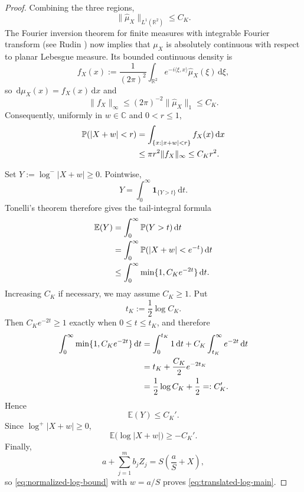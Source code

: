 \documentclass[11pt]{article}
\theoremstyle{definition}
\newcommand{\C}{\mathbb C}
\newcommand{\R}{\mathbb R}
\newcommand{\dd}{\,\mathrm d}
\newcommand{\1}{\mathbf 1}
\begin{document}
\begin{proof}
Combining the three regions,
\begin{equation}\label{eq:L1-characteristic}
\|\widehat\mu_X\|_{L^1(\R^2)}\le C_K.
\end{equation}
The Fourier inversion theorem for finite measures with integrable Fourier transform (see Rudin \cite[Section~1.5.2]{Rudin1962}) now implies that $\mu_X$ is absolutely continuous with respect to planar Lebesgue measure.  Its bounded continuous density is
\begin{equation}\label{eq:density-definition}
f_X(x)
:=
\frac1{(2\pi)^2}
\int_{\R^2}e^{-i\langle\xi,x\rangle}
\widehat\mu_X(\xi)\dd\xi,
\end{equation}
so $\dd\mu_X(x)=f_X(x)\dd x$ and
\begin{equation}\label{eq:density-bound}
\|f_X\|_\infty
\le(2\pi)^{-2}\|\widehat\mu_X\|_1
\le C_K.
\end{equation}
Consequently, uniformly in $w\in\C$ and $0<r\le1$,
\begin{align}
\mathbb P(|X+w|<r)
&=\int_{\{x:|x+w|<r\}}f_X(x)\dd x\notag\\
&\le \pi r^2\|f_X\|_\infty
\le C_Kr^2.
\label{eq:small-ball}
\end{align}

Set $Y:=\log^-|X+w|\ge0$.  Pointwise,
\[
Y=\int_0^\infty\mathbf 1_{\{Y>t\}}\dd t.
\]
Tonelli's theorem therefore gives the tail-integral formula
\begin{align}
\mathbb E(Y)
&=\int_0^\infty\mathbb P(Y>t)\dd t\notag\\
&=\int_0^\infty\mathbb P(|X+w|<e^{-t})\dd t\notag\\
&\le\int_0^\infty\min\{1,C_Ke^{-2t}\}\dd t.
\label{eq:negative-log-tail}
\end{align}
Increasing $C_K$ if necessary, we may assume $C_K\ge1$.  Put
\[
t_K:=\frac12\log C_K.
\]
Then $C_Ke^{-2t}\ge1$ exactly when $0\le t\le t_K$, and therefore
\begin{align}
\int_0^\infty\min\{1,C_Ke^{-2t}\}\dd t
&=\int_0^{t_K}1\dd t
+C_K\int_{t_K}^\infty e^{-2t}\dd t\notag\\
&=t_K+\frac{C_K}{2}e^{-2t_K}\notag\\
&=\frac12\log C_K+\frac12
=:C_K'.
\label{eq:negative-log-bound}
\end{align}
Hence
\[
\mathbb E(Y)\le C_K'.
\]
Since $\log^+|X+w|\ge0$,
\begin{equation}\label{eq:normalized-log-bound}
\mathbb E\bigl(\log|X+w|\bigr)\ge-C_K'.
\end{equation}
Finally,
\[
a+\sum_{j=1}^mb_jZ_j
=S\left(\frac aS+X\right),
\]
so \eqref{eq:normalized-log-bound} with $w=a/S$ proves \eqref{eq:translated-log-main}.
\end{proof}
\end{document}
